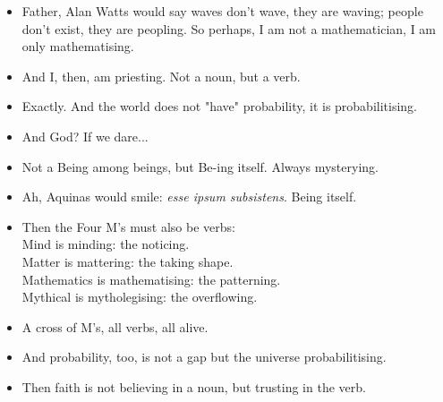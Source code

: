 \begin{itemize}[leftmargin=2cm,labelsep=1em]
    \item[\textbf{Eleanor:}] 
    Father, Alan Watts would say waves don't wave, they are waving;  
    people don't exist, they are peopling. So perhaps, I am not a mathematician,  
    I am only mathematising.

    \item[\textbf{Priest:}] 
    And I, then, am priesting. Not a noun, but a verb.

    \item[\textbf{Eleanor:}] 
    Exactly. And the world does not "have" probability, it is probabilitising.

    \item[\textbf{Priest:}] 
    And God? If we dare...

    \item[\textbf{Eleanor:}] 
    Not a Being among beings, but Be-ing itself. Always mysterying.

    \item[\textbf{Priest:}] 
    Ah, Aquinas would smile: \emph{esse ipsum subsistens}. Being itself.

    \item[\textbf{Eleanor:}] 
    Then the Four M’s must also be verbs: \\ 
    Mind is minding: the noticing. \\ 
    Matter is mattering: the taking shape. \\
    Mathematics is mathematising: the patterning. \\
    Mythical is mytholegising: the overflowing.

    \item[\textbf{Priest:}] 
    A cross of M’s, all verbs, all alive.

    \item[\textbf{Eleanor:}] 
    And probability, too, is not a gap but the universe probabilitising.

    \item[\textbf{Priest:}] 
    Then faith is not believing in a noun, but trusting in the verb.
\end{itemize}
